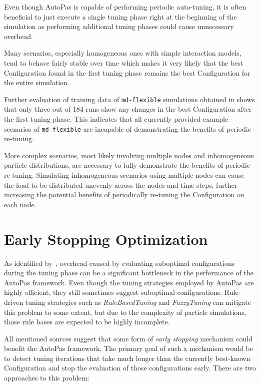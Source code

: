 \documentclass[conference]{IEEEtran}
\begin{document}
Even though AutoPas is capable of performing periodic auto-tuning, it is often beneficial to just execute a single tuning phase right at the beginning of the simulation as performing additional tuning phases could cause unnecessary overhead.

Many scenarios, especially homogeneous ones with simple interaction models, tend to behave fairly stable over time which makes it very likely that the best Configuration found in the first tuning phase remains the best Configuration for the entire simulation.

Further evaluation of training data of \texttt{md-flexible} simulations obtained in \cite{lerchner2024} shows that only three out of 184 runs show any changes in the best Configuration after the first tuning phase. This indicates that all currently provided example scenarios of \texttt{md-flexible} are incapable of demonstrating the benefits of periodic re-tuning.

More complex scenarios, most likely involving multiple nodes and inhomogeneous particle distributions, are necessary to fully demonstrate the benefits of periodic re-tuning. Simulating inhomogeneous scenarios using multiple nodes can cause the load to be distributed unevenly across the nodes and time steps, further increasing the potential benefits of periodically re-tuning the Configuration on each node.


\newpage
\newpage


\section{Early Stopping Optimization}

As identified by~\cite{autopas_issue673}\cite{endreport.pdf}\cite{Manuel_Lerchner_Thesis.pdf}, overhead caused by evaluating suboptimal configurations during the tuning phase can be a significant bottleneck in the performance of the AutoPas framework. Even though the tuning strategies employed by AutoPas are highly efficient, they still sometimes suggest suboptimal configurations. Rule-driven tuning strategies such as \textit{RuleBasedTuning} and \textit{FuzzyTuning} can mitigate this problem to some extent, but due to the complexity of particle simulations, those rule bases are expected to be highly incomplete.

All mentioned sources suggest that some form of \textit{early stopping} mechanism could benefit the AutoPas framework. The primary goal of such a mechanism would be to detect tuning iterations that take much longer than the currently best-known Configuration and stop the evaluation of those configurations early. There are two approaches to this problem:
\end{document}
